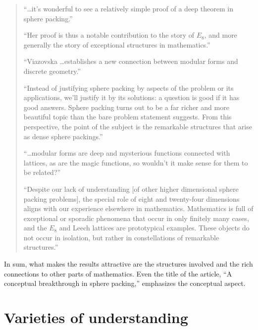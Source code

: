 \documentclass{amsart}
\theoremstyle{definition}
\theoremstyle{remark}
\numberwithin{equation}{section}
\begin{document}
\begin{quote}

\smallskip

``\ldots it's wonderful to see a relatively simple proof of a deep theorem in sphere packing.''

\smallskip

``Her proof is thus a notable contribution to the story of $E_8$, and more generally the story of exceptional structures in mathematics.''

\smallskip

``Viazovska \ldots establishes a new connection between modular forms and discrete geometry.''

\smallskip

``Instead of justifying sphere packing by aspects of the problem or its applications, we'll justify it by its solutions: a question is good if it has good answers. Sphere packing turns out to be a far richer and more beautiful topic than the bare problem statement suggests. From this perspective, the point of the subject is the remarkable structures that arise as dense sphere packings.''

\smallskip

``\ldots modular forms are deep and mysterious functions connected with lattices, as are the magic functions, so wouldn't it make sense for them to be related?''

\smallskip

``Despite our lack of understanding [of other higher dimensional sphere packing problems], the special role of eight and twenty-four dimensions aligns with our experience elsewhere in mathematics. Mathematics is full of exceptional or sporadic phenomena that occur in only finitely many cases, and the $E_8$ and Leech lattices are prototypical examples. These objects do not occur in isolation, but rather in constellations of remarkable structures.''

\smallskip

\end{quote}
In sum, what makes the results attractive are the structures involved and the rich connections to other parts of mathematics. Even the title of the article, ``A conceptual breakthrough in sphere packing,'' emphasizes the conceptual aspect.

\section{Varieties of understanding}
\label{section:discussion}
\end{document}
